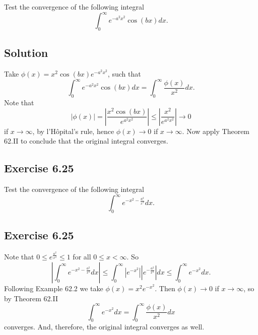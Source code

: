 Test the convergence of the following integral
\begin{equation*}
    \int_0^{\infty} e^{-a^2 x^2} \cos(b x) dx.
\end{equation*}

\subsection*{Solution}

Take $\phi(x) = x^2 \cos(bx) e^{-a^2 x^2}$, such that
\begin{equation*}
    \int_0^{\infty} e^{-a^2 x^2} \cos(b x) dx = \int_0^{\infty} \frac{\phi(x)}{x^2} dx.
\end{equation*}
Note that
\begin{equation*}
    |\phi(x)| = \left| \frac{x^2 \cos(bx)}{e^{a^2 x^2}} \right| \leq \left| \frac{x^2}{e^{a^2 x^2}} \right| \to 0
\end{equation*}
if $x \to \infty$, by l'H\^opital's rule, hence $\phi(x) \to 0$ if $x \to \infty$.
Now apply Theorem 62.II to conclude that the original integral converges.


\subsection*{Exercise 6.25}

Test the convergence of the following integral
\begin{equation*}
    \int_0^{\infty} e^{-x^2 - \frac{a^2}{x^2}} dx.
\end{equation*}

\subsection*{Exercise 6.25}

Note that $0 \leq e^{\frac{a^2}{x^2}} \leq 1$ for all $0 \leq x < \infty$.
So
\begin{equation*}
    \left| \int_0^{\infty} e^{-x^2 - \frac{a^2}{x^2}} dx \right|
        \leq \int_0^{\infty} \left|e^{-x^2}\right| \left|e^{-\frac{a^2}{x^2}}\right| dx
        \leq \int_0^{\infty} e^{-x^2} dx.
\end{equation*}
Following Example 62.2 we take $\phi(x) = x^2e^{-x^2}$.
Then $\phi(x) \to 0$ if $x \to \infty$, so by Theorem 62.II
\begin{equation*}
    \int_0^{\infty} e^{-x^2} dx = \int_0^{\infty} \frac{\phi(x)}{x^2} dx
\end{equation*}
converges.
And, therefore, the original integral converges as well.



